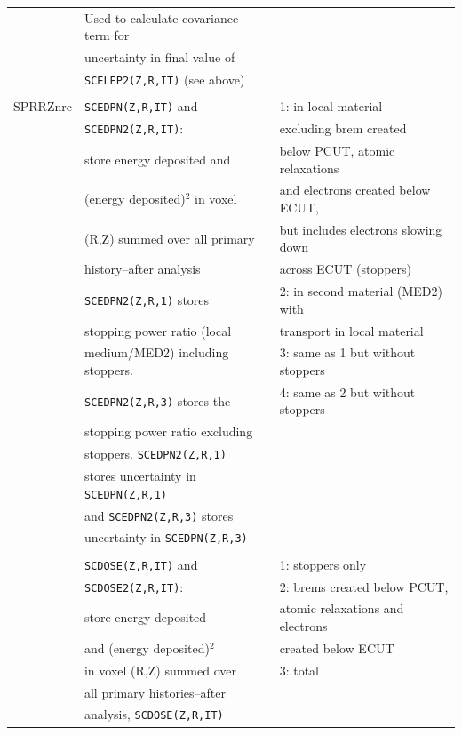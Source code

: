 \documentclass[12pt,twoside]{article}  %
\begin{document}
\begin{longtable}{lll}
         & Used to calculate covariance term for&\\
         & uncertainty in final value of &\\
         & {\tt SCELEP2(Z,R,IT)} (see above)&\\
         &&\\
SPRRZnrc & {\tt SCEDPN(Z,R,IT)} and & 1: in local material \\
         & {\tt SCEDPN2(Z,R,IT)}: &  excluding brem created \\
         & store energy deposited and &  below PCUT, atomic relaxations \\
         & (energy deposited)$^2$ in voxel&  and electrons created below ECUT,\\
         & (R,Z) summed over all primary & but includes electrons slowing down\\
         & history--after analysis  &  across ECUT (stoppers)\\
         & {\tt SCEDPN2(Z,R,1)} stores & 2: in second material (MED2) with\\
         & stopping power ratio (local &  transport in local material  \\
         & medium/MED2) including stoppers.& 3: same as 1 but without stoppers\\
        & {\tt SCEDPN2(Z,R,3)} stores the & 4: same as 2 but without stoppers\\
         & stopping power ratio excluding &\\
         & stoppers.  {\tt SCEDPN2(Z,R,1)} &\\
         & stores uncertainty in {\tt SCEDPN(Z,R,1)}&\\
         & and {\tt SCEDPN2(Z,R,3)} stores &\\
         & uncertainty in {\tt SCEDPN(Z,R,3)}&\\
         &&\\
         & {\tt SCDOSE(Z,R,IT)} and & 1: stoppers only\\
         & {\tt SCDOSE2(Z,R,IT)}: & 2: brems created below PCUT,\\
         & store energy deposited &  atomic relaxations and electrons\\
         & and (energy deposited)$^2$ & created below ECUT\\
         & in voxel (R,Z) summed over & 3: total\\
         & all primary histories--after &\\
         & analysis, {\tt SCDOSE(Z,R,IT)} &\\

\end{longtable}
\end{document}
